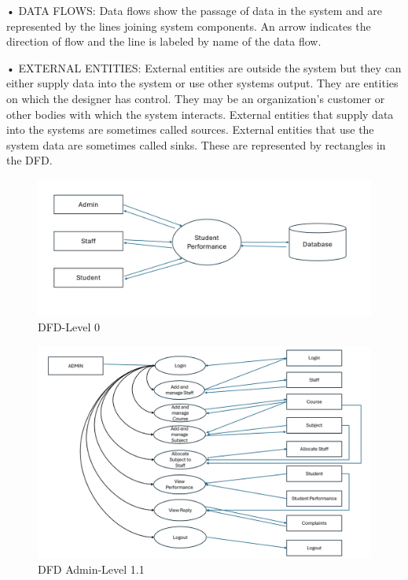 \par • DATA FLOWS: Data flows show the passage of data in the system and are
represented by the lines joining system components. An arrow indicates the
direction of flow and the line is labeled by name of the data flow.
\par • EXTERNAL ENTITIES: External entities are outside the system but they can
either supply data into the system or use other systems output. They are entities
on which the designer has control. They may be an organization’s customer or
other bodies with which the system interacts. External entities that supply data
into the systems are sometimes called sources. External entities that use the system data are sometimes called sinks. These are represented by rectangles in
the DFD.

\begin{figure}[!ht]
\centering
\includegraphics[width=125mm]{dfd.png}
\caption{DFD-Level 0}
\end{figure} 

\begin{figure}[!ht]
\centering
\includegraphics[width=125mm]{admin dfd.png}
\caption{DFD Admin-Level 1.1}
\end{figure} 

